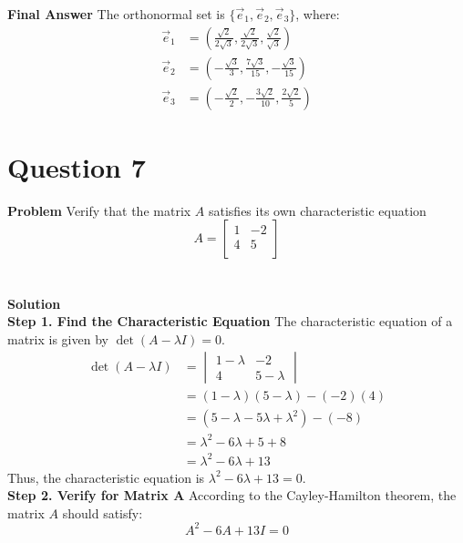\documentclass{article}
\begin{document}
\textbf{Final Answer} The orthonormal set is
$\{ \vec{e}_{1}, \vec{e}_{2}, \vec{e}_{3} \}$, where:
\begin{align*}
	\vec{e}_{1} & =
	\left(
	\frac{\sqrt{2}}{2\sqrt{3}}, \frac{\sqrt{2}}{2\sqrt{3}}, \frac{\sqrt{2}}{\sqrt{3}}
	\right)         \\
	\vec{e}_{2} & =
	\left(
	-\frac{\sqrt{3}}{3}, \frac{7\sqrt{3}}{15}, -\frac{\sqrt{3}}{15}
	\right)         \\
	\vec{e}_{3} & =
	\left(
	-\frac{\sqrt{2}}{2}, -\frac{3\sqrt{2}}{10}, \frac{2\sqrt{2}}{5}
	\right)
\end{align*}

\pagebreak


\section{Question 7}
\textbf{Problem}
Verify that the matrix $A$ satisfies its own characteristic equation
\[
	A =
	\begin{bmatrix}
		1 & -2 \\
		4 & 5  \\
	\end{bmatrix}
\]
\\
\\
\textbf{Solution}
\\
\textbf{Step 1. Find the Characteristic Equation}
The characteristic equation of a matrix is given by $\det(A - \lambda I) = 0$.
\begin{align*}
	\det(A - \lambda I) & = \begin{vmatrix} 1 - \lambda & -2 \\ 4 & 5 - \lambda \end{vmatrix} \\
	                    & = (1 - \lambda)(5 - \lambda) - (-2)(4)                              \\
	                    & = (5 - \lambda - 5\lambda + \lambda^2) - (-8)                       \\
	                    & = \lambda^2 - 6\lambda + 5 + 8                                      \\
	                    & = \lambda^2 - 6\lambda + 13
\end{align*}
Thus, the characteristic equation is $\lambda^2 - 6\lambda + 13 = 0$.
\\
\textbf{Step 2. Verify for Matrix A}
According to the Cayley-Hamilton theorem, the matrix $A$ should satisfy:
\[
	A^2 - 6A + 13I = 0
\]
\end{document}
